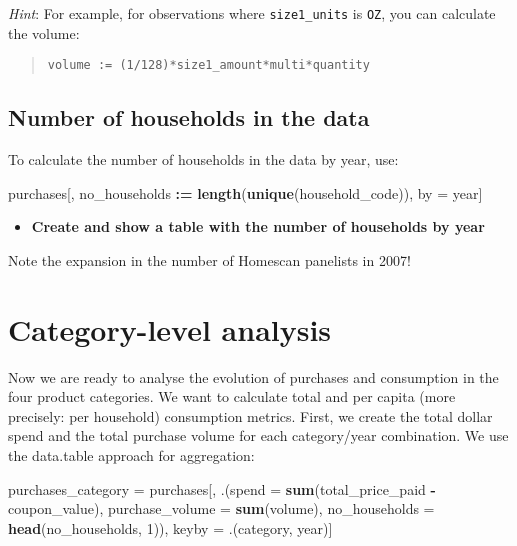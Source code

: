 \documentclass[
]{article}
\newenvironment{Shaded}{\begin{snugshade}}{\end{snugshade}}
\newcommand{\AttributeTok}[1]{\textcolor[rgb]{0.13,0.29,0.53}{#1}}
\newcommand{\DecValTok}[1]{\textcolor[rgb]{0.00,0.00,0.81}{#1}}
\newcommand{\FunctionTok}[1]{\textcolor[rgb]{0.13,0.29,0.53}{\textbf{#1}}}
\newcommand{\NormalTok}[1]{#1}
\newcommand{\OtherTok}[1]{\textcolor[rgb]{0.56,0.35,0.01}{#1}}
\newcommand{\SpecialCharTok}[1]{\textcolor[rgb]{0.81,0.36,0.00}{\textbf{#1}}}
\providecommand{\tightlist}{%
  \setlength{\itemsep}{0pt}\setlength{\parskip}{0pt}}
\begin{document}
\emph{Hint}: For example, for observations where \texttt{size1\_units}
is \texttt{OZ}, you can calculate the volume:

\begin{quote}
\texttt{volume\ :=\ (1/128)*size1\_amount*multi*quantity}
\end{quote}

\subsection{Number of households in the
data}\label{number-of-households-in-the-data}

To calculate the number of households in the data by year, use:

\begin{Shaded}
\begin{Highlighting}[]
\NormalTok{purchases[, no\_households }\SpecialCharTok{:=} \FunctionTok{length}\NormalTok{(}\FunctionTok{unique}\NormalTok{(household\_code)), by }\OtherTok{=}\NormalTok{ year]}
\end{Highlighting}
\end{Shaded}

\begin{itemize}
\tightlist
\item
  \textbf{Create and show a table with the number of households by year}
\end{itemize}

Note the expansion in the number of Homescan panelists in 2007!

\newpage

\section{Category-level analysis}\label{category-level-analysis}

Now we are ready to analyse the evolution of purchases and consumption
in the four product categories. We want to calculate total and per
capita (more precisely: per household) consumption metrics. First, we
create the total dollar spend and the total purchase volume for each
category/year combination. We use the data.table approach for
aggregation:

\begin{Shaded}
\begin{Highlighting}[]
\NormalTok{purchases\_category }\OtherTok{=}\NormalTok{ purchases[,}
\NormalTok{   .(}\AttributeTok{spend           =} \FunctionTok{sum}\NormalTok{(total\_price\_paid }\SpecialCharTok{{-}}\NormalTok{ coupon\_value),}
     \AttributeTok{purchase\_volume =} \FunctionTok{sum}\NormalTok{(volume),}
     \AttributeTok{no\_households   =} \FunctionTok{head}\NormalTok{(no\_households, }\DecValTok{1}\NormalTok{)),}
\NormalTok{   keyby }\OtherTok{=}\NormalTok{ .(category, year)]}
\end{Highlighting}
\end{Shaded}
\end{document}
